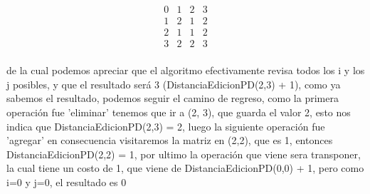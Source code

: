 \begin{equation}
\begin{matrix}
    0 & 1 & 2 & 3 \\
    1 & 2 & 1 & 2 \\
    2 & 1 & 1 & 2 \\
    3 & 2 & 2 & 3 \\
\end{matrix}
\end{equation}

de la cual podemos apreciar que el algoritmo efectivamente revisa todos los i y los j posibles, y que el resultado será 3 (DistanciaEdicionPD(2,3) + 1), como ya sabemos el resultado, podemos seguir el camino de regreso, como la primera operación fue 'eliminar' tenemos que ir a (2, 3), que guarda el valor 2, esto nos indica que DistanciaEdicionPD(2,3) = 2, luego la siguiente operación fue 'agregar' en consecuencia visitaremos la matriz en (2,2), que es 1, entonces DistanciaEdicionPD(2,2) = 1, por ultimo la operación que viene sera transponer, la cual tiene un costo de 1, que viene de DistanciaEdicionPD(0,0) + 1, pero como i=0 y j=0, el resultado es 0
